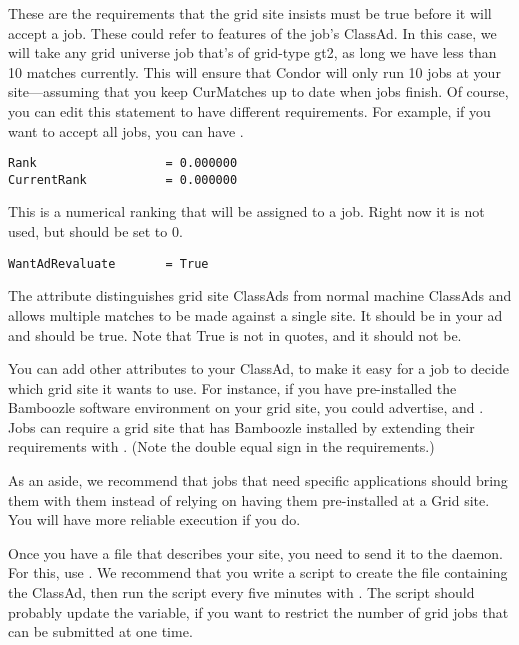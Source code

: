 These are the requirements that the grid site insists must be true
before it will accept a job. These could refer to features of the
job's ClassAd. In this case, we will take any grid universe job that's
of grid-type gt2, as
long we have less than 10 matches currently. This will ensure that
Condor will only run 10 jobs at your site---assuming that you keep
CurMatches up to date when jobs finish. Of course, you can edit this
statement to have different requirements. For example, if you want to
accept all jobs, you can have .

\footnotesize
\begin{verbatim}
Rank                  = 0.000000
CurrentRank           = 0.000000
\end{verbatim}
\normalsize

This is a numerical ranking that will be assigned to a job. Right now
it is not used, but should be set to 0. 

\begin{verbatim}
WantAdRevaluate       = True
\end{verbatim}

The  attribute distinguishes grid site
ClassAds from normal machine ClassAds and allows multiple matches to
be made against a single site. It should be in your ad and should be
true. Note that True is not in quotes, and it should not be.

You can add other attributes to your ClassAd, to make it easy for a
job to decide which grid site it wants to use. For instance, if you
have pre-installed the Bamboozle software environment on your grid
site, you could advertise,  and
. Jobs can require a grid site that has
Bamboozle installed by extending their requirements with
. (Note the double equal sign in the
requirements.) 

As an aside, we recommend that jobs that need specific applications
should bring them with them instead of relying on having them
pre-installed at a Grid site. You will have more reliable execution if
you do. 

Once you have a file that describes your site, you need to send it to
the  daemon. For this, use .
We recommend that you write a script to create the file
containing the ClassAd, then run the script every five minutes with
. The script should probably update the 
variable, if you
want to restrict the number of grid jobs that can be submitted at one
time. 

